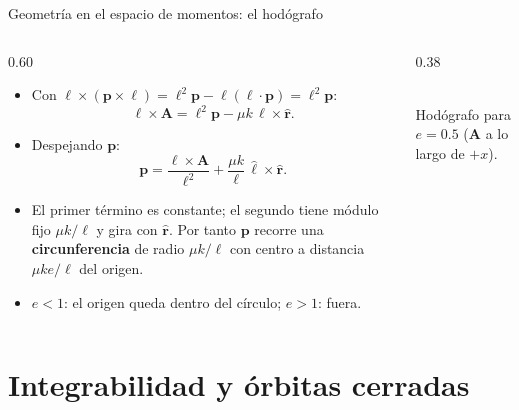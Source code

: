 \documentclass[aspectratio=169]{beamer}
\newcommand{\vp}{\mathbf p}
\newcommand{\vA}{\mathbf A}
\newcommand{\vl}{\boldsymbol\ell}
\newcommand{\rh}{\hat{\mathbf r}}
\begin{document}
\begin{frame}{Geometría en el espacio de momentos: el hodógrafo}
\begin{columns}[T]
\begin{column}{0.60\textwidth}
\small
\begin{itemize}
  \item<1-> Con $\vl\times(\vp\times\vl)=\ell^{2}\vp-\vl(\vl\cdot\vp)=\ell^{2}\vp$:
  \[
    \vl\times\vA=\ell^{2}\vp-\mu k\,\vl\times\rh .
  \]
  \item<2-> Despejando $\vp$:
  \[
    \vp=\frac{\vl\times\vA}{\ell^{2}}+\frac{\mu k}{\ell}\,\hat{\vl}\times\rh .
  \]
  \item<3-> El primer término es constante; el segundo tiene módulo fijo $\mu k/\ell$
        y gira con $\rh$. Por tanto $\vp$ recorre una \textbf{circunferencia} de radio
        $\mu k/\ell$ con centro a distancia $\mu k e/\ell$ del origen.
  \item<4-> $e<1$: el origen queda dentro del círculo; $e>1$: fuera.
\end{itemize}
\end{column}
\begin{column}{0.38\textwidth}
\centering
{}\\[2pt]
{\scriptsize Hodógrafo para $e=0.5$ ($\vA$ a lo largo de $+x$).}
\end{column}
\end{columns}
\end{frame}

\section[Integrabilidad]{Integrabilidad y órbitas cerradas}
\end{document}

